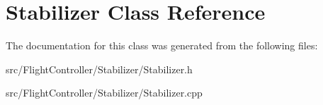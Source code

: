 \hypertarget{classStabilizer}{}\section{Stabilizer Class Reference}
\label{classStabilizer}


The documentation for this class was generated from the following files\+:\begin{DoxyCompactItemize}
\item 
src/\+Flight\+Controller/\+Stabilizer/Stabilizer.\+h\item 
src/\+Flight\+Controller/\+Stabilizer/Stabilizer.\+cpp\end{DoxyCompactItemize}
